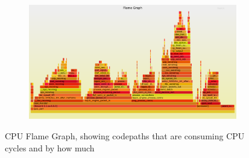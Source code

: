 \begin{frame}

\begin{figure}[!htb]
    \centering
    \begin{subfigure}{1\textwidth}
        \includegraphics[width=\linewidth]{./plots/perf_flame_graphs/quic/kernel.png}
    \end{subfigure}
    
    \caption{CPU Flame Graph, showing codepaths that are consuming CPU cycles and by how much}\label{fig:cpu-flame-graph-}
\end{figure}

\end{frame}
\clearpage

%

